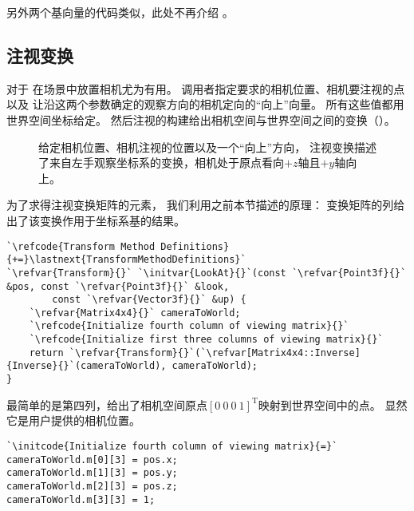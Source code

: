 另外两个基向量的代码类似，此处不再介绍
。

\subsection{注视变换}\label{sub:注视变换}
对于
在场景中放置相机尤为有用。
调用者指定要求的相机位置、相机要注视的点以及
让沿这两个参数确定的观察方向的相机定向的“向上”向量。
所有这些值都用世界空间坐标给定。
然后注视的构建给出相机空间与世界空间之间的变换（）。
\begin{figure}[htbp]
    \centering
    \caption{给定相机位置、相机注视的位置以及一个“向上”方向，
        注视变换描述了来自左手观察坐标系的变换，相机处于原点看向$+z$轴且$+y$轴向上。}
    \label{fig:2.13}
\end{figure}

为了求得注视变换矩阵的元素，
我们利用之前本节描述的原理：
变换矩阵的列给出了该变换作用于坐标系基的结果。
\begin{lstlisting}
`\refcode{Transform Method Definitions}{+=}\lastnext{TransformMethodDefinitions}`
`\refvar{Transform}{}` `\initvar{LookAt}{}`(const `\refvar{Point3f}{}` &pos, const `\refvar{Point3f}{}` &look,
        const `\refvar{Vector3f}{}` &up) {
    `\refvar{Matrix4x4}{}` cameraToWorld;
    `\refcode{Initialize fourth column of viewing matrix}{}`
    `\refcode{Initialize first three columns of viewing matrix}{}`
    return `\refvar{Transform}{}`(`\refvar[Matrix4x4::Inverse]{Inverse}{}`(cameraToWorld), cameraToWorld);
}
\end{lstlisting}

最简单的是第四列，给出了相机空间原点$[0\ 0\ 0\ 1]^\mathrm{T}$映射到世界空间中的点。
显然它是用户提供的相机位置。
\begin{lstlisting}
`\initcode{Initialize fourth column of viewing matrix}{=}`
cameraToWorld.m[0][3] = pos.x;
cameraToWorld.m[1][3] = pos.y;
cameraToWorld.m[2][3] = pos.z;
cameraToWorld.m[3][3] = 1;
\end{lstlisting}

